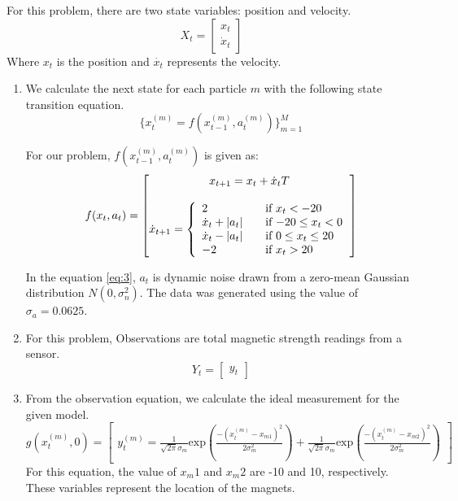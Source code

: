 \documentclass{article}
\begin{document}
For this problem, there are two state variables: position and velocity.\\
\begin{equation}
X_t = \begin{bmatrix}
x_t \\
\dot{x}_t
\end{bmatrix}
\label{eq:1}
\end{equation}
Where $x_t$ is the position and $\dot{x_t}$ represents the velocity.\\  

\begin{enumerate}
\item We calculate the next state for each particle $m$ with the following state transition equation.
\begin{equation}
	\lbrace x_t^{(m)} = f(x_{t-1}^{(m)},a_t^{(m)}) \rbrace ^M_{m=1}
	\label{eq:2}
\end{equation}

For our problem, $ f(x_{t-1}^{(m)},a_t^{(m)})$ is given as:
\begin{equation}
f(x_t,a_t) = \begin{bmatrix}
{x_{t+1} = x_t + \dot{x}_t T} \\ \\
\dot{x}_{t+1} = \left\{
\begin{array}{l l}
  2 & \quad \text{if $x_t < -20$} \\
  \dot{x}_t + |a_t| & \quad \text{if $-20 \le x_t < 0$} \\
  \dot{x}_t - |a_t| & \quad \text{if $0 \le x_t \le 20$} \\
  -2 & \quad \text{if $x_t > 20$} \\
\end{array} \right.
\end{bmatrix}
\label{eq:3}
\end{equation}

In the equation \ref{eq:3}, $a_t$ is dynamic noise drawn from a zero-mean Gaussian distribution  $N(0,\sigma_n^2)$. The data was generated using the value of $\sigma_a = 0.0625$.

\item For this problem, Observations are total magnetic strength readings from a sensor.
\begin{equation}
Y_t = \begin{bmatrix} y_t \end{bmatrix}
\label{eq:4}
\end{equation}

\item From the observation equation, we calculate the ideal measurement for the given model.
\begin{equation}
	g(x_t^{(m)},0) = \begin{bmatrix}
	y_t^{(m)} = \frac{1}{\sqrt{2 \pi} \sigma_m}
	\mathrm{exp} ( \frac{-(x_t^{(m)} - x_{m1})^2}{2 \sigma_m^2} ) +
	\frac{1}{\sqrt{2 \pi} \sigma_m}
	\mathrm{exp} ( \frac{-(x_t^{(m)} - x_{m2})^2}{2 \sigma_m^2} )
	\end{bmatrix}
\label{eq:5}
\end{equation}
 For this equation, the value of $x_m1$ and $x_m2$ are -10 and 10, respectively. These variables represent the location of the magnets.


\end{enumerate}
\end{document}
